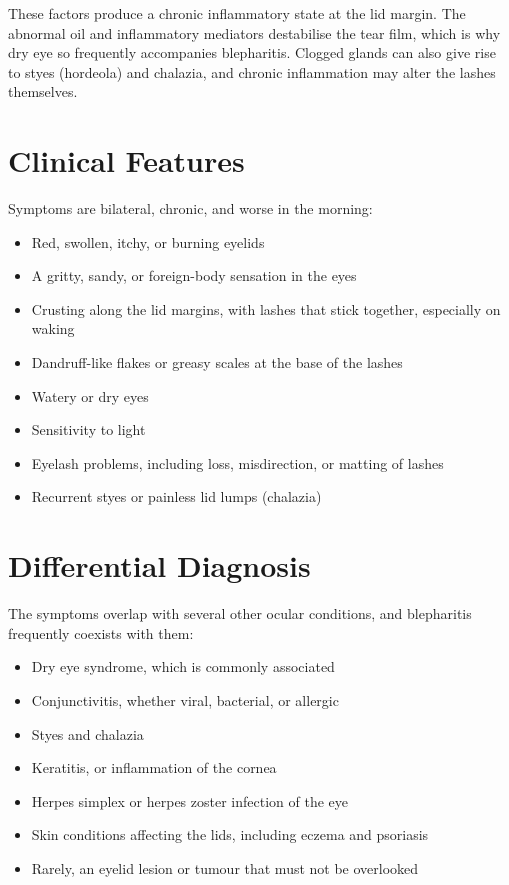 These factors produce a chronic inflammatory state at the lid margin. The abnormal oil and inflammatory mediators destabilise the tear film, which is why dry eye so frequently accompanies blepharitis. Clogged glands can also give rise to styes (hordeola) and chalazia, and chronic inflammation may alter the lashes themselves.

\section*{Clinical Features}
Symptoms are bilateral, chronic, and worse in the morning:

\begin{itemize}
    \item Red, swollen, itchy, or burning eyelids
    \item A gritty, sandy, or foreign-body sensation in the eyes
    \item Crusting along the lid margins, with lashes that stick together, especially on waking
    \item Dandruff-like flakes or greasy scales at the base of the lashes
    \item Watery or dry eyes
    \item Sensitivity to light
    \item Eyelash problems, including loss, misdirection, or matting of lashes
    \item Recurrent styes or painless lid lumps (chalazia)
\end{itemize}

\section*{Differential Diagnosis}
The symptoms overlap with several other ocular conditions, and blepharitis frequently coexists with them:

\begin{itemize}
    \item Dry eye syndrome, which is commonly associated
    \item Conjunctivitis, whether viral, bacterial, or allergic
    \item Styes and chalazia
    \item Keratitis, or inflammation of the cornea
    \item Herpes simplex or herpes zoster infection of the eye
    \item Skin conditions affecting the lids, including eczema and psoriasis
    \item Rarely, an eyelid lesion or tumour that must not be overlooked
\end{itemize}

